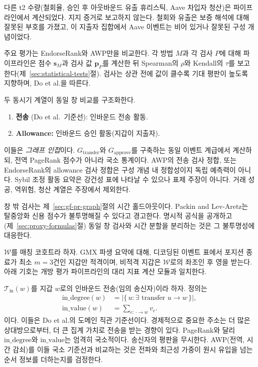 다른 t2 수량(철회율, 승인 후 아웃바운드 유출 휴리스틱, Aave 차입자 청산)은 파이프라인에서 계산되었다. 지지 증거로 보고하지 않는다. 철회와 유출은 보증 해석에 대해 잘못된 부호를 가졌고, 이 지출자 집합에서 Aave 이벤트는 비어 있거나 잘못된 구성 개념이었다.


주요 평가는 EndorseRank와 AWP만을 비교한다. 각 방법 $M$과 각 검사 $P$에 대해 파이프라인은 점수 $\mathbf{s}_M$과 검사 값 $\mathbf{p}_P$를 계산한 뒤 Spearman의 $\rho$와 Kendall의 $\tau$를 보고한다(제~\ref{sec:statistical-tests}절). 검사는 상관 전에 값이 클수록 기대 평판이 높도록 지향하며, Do et al.을 따른다.

두 동시기 계열이 동일 창 비교를 구조화한다.
\begin{enumerate}
\item \textbf{전송} (Do et al.\ 기준선): 인바운드 전송 활동.
\item \textbf{Allowance:} 인바운드 승인 활동(지갑이 지출자).
\end{enumerate}
이들은 \emph{그래프 인접}이다. $G_{\mathrm{transfer}}$와 $G_{\mathrm{approve}}$를 구축하는 동일 이벤트 계급에서 계산하되, 전역 PageRank 점수가 아니라 국소 통계이다. AWP의 전송 검사 정합, 또는 EndorseRank의 allowance 검사 정합은 구성 개념 내 정합성이지 독립 예측력이 아니다. Sybil 조정 활동 요약은 강건성 표에 나타날 수 있으나 표제 주장이 아니다. 거래 성공, 역위험, 청산 계열은 주장에서 제외한다.

창 밖 검사는 제~\ref{sec:gf-pr-graph}절의 시간 홀드아웃이다. Packin and Lev-Aretz는 탈중앙화 신용 점수가 불투명해질 수 있다고 경고한다. 명시적 공식을 공개하고(제~\ref{sec:proxy-formulas}절) 동일 창 검사와 시간 분할을 분리하는 것은 그 불투명성에 대응한다.


$\mathcal{W}$를 매칭 코호트라 하자. GMX 파생 요약에 대해, 디코딩된 이벤트 표에서 포지션 종료가 최소 $m=3$건인 지갑만 적격이며, 비적격 지갑은 $\mathcal{W}$로의 좌조인 후 영을 받는다. 아래 기호는 개방 평가 파이프라인의 대리 지표 계산 모듈과 일치한다.


$\mathcal{T}_{\mathrm{in}}(w)$를 지갑 $w$로의 인바운드 전송(임의 송신자)이라 하자. 정의는
\begin{align}
\mathrm{in\_degree}(w)
&=
\bigl|\{\,u : \exists\text{ transfer }u\to w\,\}\bigr|,
\label{eq:in-degree}\\
\mathrm{in\_value}(w)
&=
\sum_{e:\,\cdot\to w} v_e.
\label{eq:in-value}
\end{align}
이다. 이들은 Do et al.의 도메인 직관 기준선이다. 경제적으로 중요한 주소는 더 많은 상대방으로부터, 더 큰 집계 가치로 전송을 받는 경향이 있다. PageRank와 달리 $\mathrm{in\_degree}$와 $\mathrm{in\_value}$는 엄격히 국소적이다. 송신자의 평판을 무시한다. AWP(전역, 시간 감쇠)를 이들 국소 기준선과 비교하는 것은 전파와 최근성 가중이 원시 유입을 넘는 순서 정보를 더하는지를 검정한다.


